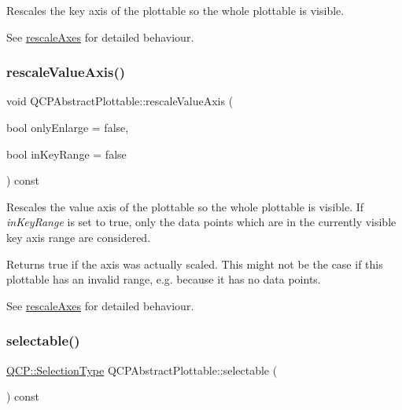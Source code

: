 Rescales the key axis of the plottable so the whole plottable is visible.

See \mbox{\hyperlink{class_q_c_p_abstract_plottable_a1491c4a606bccd2d09e65e11b79eb882}{rescale\+Axes}} for detailed behaviour. \mbox{\label{class_q_c_p_abstract_plottable_a714eaf36b12434cd71846215504db82e}} 
\subsubsection{\texorpdfstring{rescaleValueAxis()}{rescaleValueAxis()}}
{\footnotesize\ttfamily void Q\+C\+P\+Abstract\+Plottable\+::rescale\+Value\+Axis (\begin{DoxyParamCaption}\item[{bool}]{only\+Enlarge = {\ttfamily false},  }\item[{bool}]{in\+Key\+Range = {\ttfamily false} }\end{DoxyParamCaption}) const}

Rescales the value axis of the plottable so the whole plottable is visible. If {\itshape in\+Key\+Range} is set to true, only the data points which are in the currently visible key axis range are considered.

Returns true if the axis was actually scaled. This might not be the case if this plottable has an invalid range, e.\+g. because it has no data points.

See \mbox{\hyperlink{class_q_c_p_abstract_plottable_a1491c4a606bccd2d09e65e11b79eb882}{rescale\+Axes}} for detailed behaviour. \mbox{\label{class_q_c_p_abstract_plottable_a016653741033bd332d1d4c3c725cc284}} 
\subsubsection{\texorpdfstring{selectable()}{selectable()}}
{\footnotesize\ttfamily \mbox{\hyperlink{namespace_q_c_p_ac6cb9db26a564b27feda362a438db038}{Q\+C\+P\+::\+Selection\+Type}} Q\+C\+P\+Abstract\+Plottable\+::selectable (\begin{DoxyParamCaption}{ }\end{DoxyParamCaption}) const\hspace{0.3cm}{\ttfamily [inline]}}

